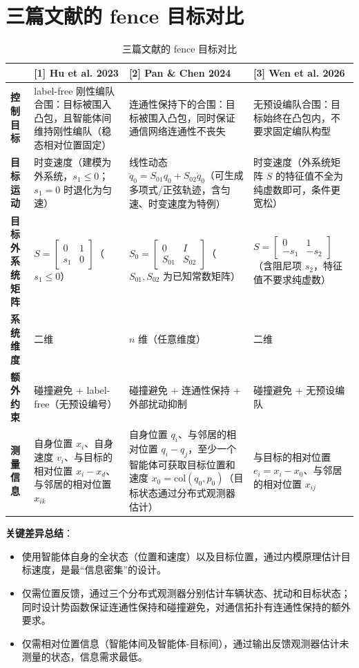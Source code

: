 

\section{三篇文献的 fence 目标对比}

\begin{table}[htbp]
\centering
\caption{三篇文献的 fence 目标对比}
\begin{tabularx}{\textwidth}{|l|X|X|X|}
\hline
 & [1] Hu et al. 2023 & [2] Pan \& Chen 2024 & [3] Wen et al. 2026 \\
\hline
\textbf{控制目标} & label-free 刚性编队合围：目标被围入凸包，且智能体间维持刚性编队（稳态相对位置固定） & 连通性保持下的合围：目标被围入凸包，同时保证通信网络连通性不丧失 & 无预设编队合围：目标始终在凸包内，不要求固定编队构型 \\
\hline
\textbf{目标运动} & 时变速度（建模为外系统，$s_1 \leq 0$；$s_1=0$ 时退化为匀速） & 线性动态 $\ddot{q}_0 = S_{01}q_0 + S_{02}\dot{q}_0$（可生成多项式/正弦轨迹，含匀速、时变速度为特例） & 时变速度（外系统矩阵 $S$ 的特征值不全为纯虚数即可，条件更宽松） \\
\hline
\textbf{目标外系统矩阵} & $S=\begin{bmatrix} 0 & 1 \\ s_1 & 0 \end{bmatrix}$（$s_1 \leq 0$） & $S_0=\begin{bmatrix} 0 & I \\ S_{01} & S_{02} \end{bmatrix}$（$S_{01},S_{02}$ 为已知常数矩阵） & $S=\begin{bmatrix} 0 & 1 \\ -s_1 & -s_2 \end{bmatrix}$（含阻尼项 $s_2$，特征值不要求纯虚数） \\
\hline
\textbf{系统维度} & 二维 & $n$ 维（任意维度） & 二维 \\
\hline
\textbf{额外约束} & 碰撞避免 + label-free（无预设编号） & 碰撞避免 + 连通性保持 + 外部扰动抑制 & 碰撞避免 + 无预设编队 \\
\hline
\textbf{测量信息} & 自身位置 $x_i$、自身速度 $v_i$、与目标的相对位置 $x_i - x_d$、与邻居的相对位置 $x_{ik}$ & 自身位置 $q_i$、与邻居的相对位置 $q_i - q_j$，至少一个智能体可获取目标位置和速度 $x_0=\mathrm{col}(q_0,p_0)$（目标状态通过分布式观测器估计） & 与目标的相对位置 $e_i = x_i - x_0$、与邻居的相对位置 $x_{ij}$ \\
\hline
\end{tabularx}
\end{table}

\textbf{关键差异总结}：
\begin{itemize}
  \item [1] 使用智能体自身的全状态（位置和速度）以及目标位置，通过内模原理估计目标速度，是最“信息密集”的设计。
  \item [2] 仅需位置反馈，通过三个分布式观测器分别估计车辆状态、扰动和目标状态；同时设计势函数保证连通性保持和碰撞避免，对通信拓扑有连通性保持的额外要求。
  \item [3] 仅需相对位置信息（智能体间及智能体-目标间），通过输出反馈观测器估计未测量的状态，信息需求最低。
\end{itemize}